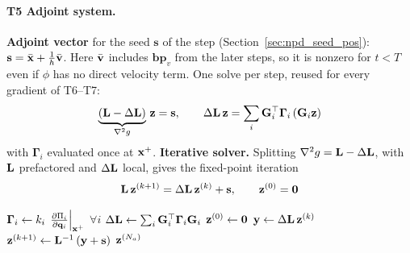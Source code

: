 \paragraph{T5 Adjoint system.}\mbox{}
\newline \textbf{Adjoint vector} for the seed $\mathbf{s}$ of the step (Section~\ref{sec:npd_seed_pos}): $\mathbf{s} = \bar{\mathbf{x}} + \tfrac{1}{h}\bar{\mathbf{v}}$. Here $\bar{\mathbf{v}}$ includes $\mathbf{bp}_v$ from the later steps, so it is nonzero for $t < T$ even if $\phi$ has no direct velocity term. One solve per step, reused for every gradient of T6--T7:
\begin{equation}
\label{eq:npd_v1_adjoint}
    \underbrace{(\mathbf{L} - \Delta\mathbf{L})}_{\nabla^2 g}\,\mathbf{z} = \mathbf{s},
    \qquad
    \Delta\mathbf{L}\,\mathbf{z} = \sum_i\mathbf{G}_i^\top\boldsymbol{\Gamma}_i\,(\mathbf{G}_i\mathbf{z})
\end{equation}
with $\boldsymbol{\Gamma}_i$ evaluated once at $\mathbf{x}^+$.
\newline \textbf{Iterative solver.} Splitting $\nabla^2 g = \mathbf{L} - \Delta\mathbf{L}$, with $\LL$ prefactored and $\Delta\mathbf{L}$ local, gives the fixed-point iteration
\begin{equation}
\label{eq:npd_v1_adjoint_iter}
    \mathbf{L}\,\mathbf{z}^{(k+1)} = \Delta\mathbf{L}\,\mathbf{z}^{(k)} + \mathbf{s},
    \qquad
    \mathbf{z}^{(0)} = \mathbf{0}
\end{equation}
\begin{algorithm}[H]
\caption{V1: adjoint solve for one step (reuses the factorization of $\LL$).}
\label{alg:npd_v1_adjoint}
\begin{algorithmic}[1]
    \State $\boldsymbol{\Gamma}_i \gets k_i\,\left.\frac{\partial \Pi_i}{\partial \mathbf{q}_i}\right|_{\mathbf{x}^+}$ \quad $\forall i$ 
    \State $\Delta\mathbf{L} \gets \sum_i \mathbf{G}_i^\top\boldsymbol{\Gamma}_i\mathbf{G}_i$
    \State $\mathbf{z}^{(0)} \gets \mathbf{0}$
        \State $\mathbf{y} \gets \Delta\mathbf{L}\,\mathbf{z}^{(k)}$ 
        \State $\mathbf{z}^{(k+1)} \gets \mathbf{L}^{-1}\left(\mathbf{y} + \mathbf{s}\right)$ 
    \EndFor
    \State \Return $\mathbf{z}^{(N_a)}$
\EndFunction
\end{algorithmic}
\end{algorithm}
